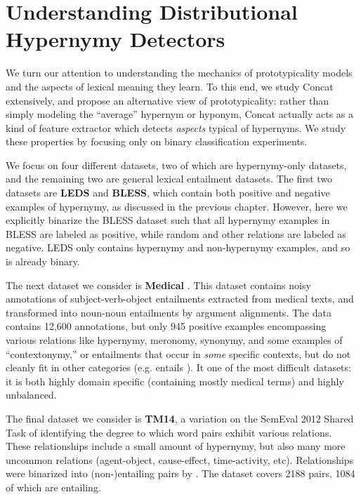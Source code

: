 \section{Understanding Distributional Hypernymy Detectors}

We turn our attention to understanding the mechanics of prototypicality models
and the aspects of lexical meaning they learn.
To this end, we study Concat extensively, and
propose an alternative view of prototypicality: rather than simply modeling the
``average'' hypernym or hyponym, Concat actually acts as a kind of feature
extractor which detects {\em aspects} typical of hypernyms.  We study these
properties by focusing only on binary classification experiments.

We focus on four different datasets, two of which are hypernymy-only datasets, and the remaining two are general lexical entailment datasets. The first
two datasets are {\bf LEDS} and {\bf BLESS}, which contain both positive and
negative examples of hypernymy, as discussed in the previous chapter. However,
here we explicitly binarize the BLESS dataset such that all hypernymy examples
in BLESS are labeled as positive, while random and other relations are labeled
as negative. LEDS only contains hypernymy and non-hypernymy examples, and so is
already binary.

The next dataset we consider is {\bf Medical} \cite{levy:2014:conll}. This
dataset contains noisy annotations of subject-verb-object entailments
extracted from medical texts, and transformed into noun-noun entailments by
argument alignments. The data contains 12,600 annotations, but only 945
positive examples encompassing various relations like hypernymy, meronomy,
synonymy, and some examples of ``contextonymy,'' or entailments that occur in
{\em some} specific contexts, but do not cleanly fit in other categories (e.g.
 entails ). It one of the most difficult datasets:
it is both highly domain specific (containing mostly medical terms) and highly
unbalanced.

The final dataset we consider is {\bf TM14}, a variation on the SemEval 2012
Shared Task of identifying the degree to which word pairs exhibit various
relations. These relationships include a small amount of hypernymy, but also
many more uncommon relations (agent-object, cause-effect, time-activity, etc).
Relationships were binarized into (non-)entailing pairs by
.  The dataset covers 2188 pairs, 1084 of which are
entailing.


